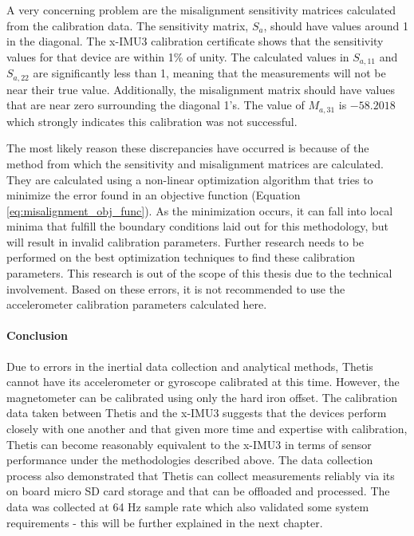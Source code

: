 A very concerning problem are the misalignment sensitivity matrices calculated from the calibration data.
The sensitivity matrix, $S_a$, should have values around 1 in the diagonal.
The x-IMU3 calibration certificate shows that the sensitivity values for that device are within 1\% of unity.
The calculated values in $S_{a,11}$ and $S_{a,22}$ are significantly less than 1, meaning that the measurements will not be near their true value.
Additionally, the misalignment matrix should have values that are near zero surrounding the diagonal 1's.
The value of $M_{a,31}$ is $-58.2018$ which strongly indicates this calibration was not successful.

The most likely reason these discrepancies have occurred is because of the method from which the sensitivity and misalignment matrices are calculated.
They are calculated using a non-linear optimization algorithm that tries to minimize the error found in an objective function (Equation \ref{eq:misalignment_obj_func}).
As the minimization occurs, it can fall into local minima that fulfill the boundary conditions laid out for this methodology, but will result in invalid calibration parameters.
Further research needs to be performed on the best optimization techniques to find these calibration parameters.
This research is out of the scope of this thesis due to the technical involvement.
Based on these errors, it is not recommended to use the accelerometer calibration parameters calculated here.

\paragraph*{Conclusion} Due to errors in the inertial data collection and analytical methods, Thetis cannot have its accelerometer or gyroscope calibrated at this time.
However, the magnetometer can be calibrated using only the hard iron offset.
The calibration data taken between Thetis and the x-IMU3 suggests that the devices perform closely with one another and that given more time and expertise with calibration, Thetis can become reasonably equivalent to the x-IMU3 in terms of sensor performance under the methodologies described above.
The data collection process also demonstrated that Thetis can collect measurements reliably via its on board micro SD card storage and that can be offloaded and processed.
The data was collected at 64 Hz sample rate which also validated some system requirements - this will be further explained in the next chapter.